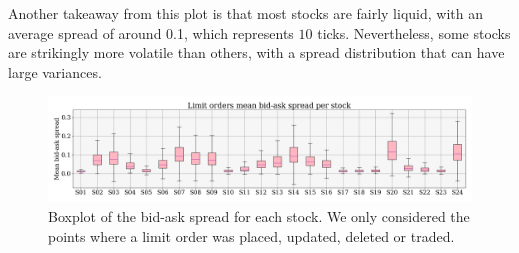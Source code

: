\documentclass[switch, 11pt]{article}
\begin{document}
\begin{multicols}{2}
    Another takeaway from this plot is that most stocks are fairly liquid, with an average spread of around 0.1, which represents $10$ ticks. Nevertheless, some stocks are strikingly more volatile than others, with a spread distribution that can have large variances.

\end{multicols}
\begin{figure}
    \centering
    \includegraphics[width=\columnwidth]{figures/mean_spread_per_stock_mo.png}
    \caption{Boxplot of the bid-ask spread for each stock. We only considered the points where a limit order was placed, updated, deleted or traded.}
    \label{fig:spread}
\end{figure}
\end{document}
